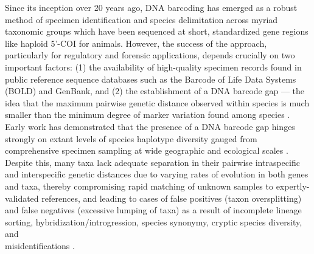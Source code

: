 \documentclass[12pt]{article}
\begin{document}
Since its inception over 20 years ago, DNA barcoding \citep{hebert2003biological, hebert2003barcoding} has emerged as a robust method of specimen identification and species delimitation across myriad \\ taxonomic groups which have been sequenced at short, standardized gene regions like haploid 5'-COI for animals. However, the success of the approach, particularly for regulatory and forensic applications, depends crucially on two important factors: (1) the availability of high-quality specimen records found in public reference sequence databases such as the Barcode of Life Data Systems (BOLD) \citep{ratnasingham2007bold} and GenBank, and (2) the establishment of a DNA barcode gap --- the idea that the maximum pairwise genetic distance observed within species is much smaller than the minimum degree of marker variation found among species \citep{meyer2005dna, meier2008use}. Early work has demonstrated that the presence of a DNA barcode gap hinges strongly on extant levels of species haplotype diversity gauged from comprehensive specimen sampling at wide geographic and ecological scales \citep{bergsten2012effect}. Despite this, many taxa lack adequate separation in their pairwise intraspecific and interspecific genetic distances due to varying rates of evolution in both genes and taxa, thereby compromising rapid matching of unknown samples to expertly-validated references, and leading to cases of false positives (taxon oversplitting) and false negatives (excessive lumping of taxa) as a result of incomplete lineage sorting, hybridization/introgression, species synonymy, cryptic species diversity, and \\ misidentifications \citep{hubert2015dna, phillips2022lack}.
\end{document}
